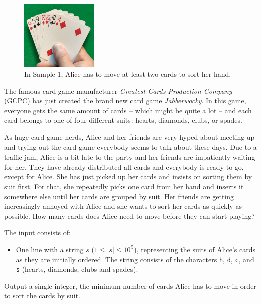 
\newcommand{\name}{Jabberwocky}

\begin{figure}
  \vspace{-5mm}
	\includegraphics[width=0.33\textwidth]{sample}
	\caption{In Sample 1, Alice has to move at least two cards to sort her hand.}
	  \vspace{-5mm}
\end{figure}
The famous card game manufacturer \emph{Greatest Cards Production Company} (GCPC) has just created the brand new card game \emph{\name}.
In this game, everyone gets the same amount of cards -- which might be quite a lot -- and each card belongs to one of four different suits: hearts, diamonds, clubs, or spades.

As huge card game nerds, Alice and her friends are very hyped about meeting up and trying out the card game \mbox{everybody} seems to talk about these days.
Due to a \mbox{traffic} jam, Alice is a bit late to the party and her friends are \mbox{impatiently} waiting for her.
They have already distributed all cards and everybody is ready to go, except for Alice.
She has just picked up her cards and insists on sorting them by suit first.
For that, she repeatedly picks one card from her hand and inserts it somewhere else until her cards are grouped by suit.
Her friends are getting increasingly annoyed with Alice and she wants to sort her cards as quickly as possible.
How many cards does Alice need to move before they can start playing?

\begin{Input}
    The input consists of:
    \begin{itemize}
        \item One line with a string $s$ ($1\leq|s|\leq 10^5$), representing the suits of Alice's cards as they are initially ordered.
        The string consists of the characters \texttt{h}, \texttt{d}, \texttt{c}, and \texttt{s} (hearts, diamonds, clubs and spades).
    \end{itemize}
\end{Input}

\begin{Output}
    Output a single integer, the minimum number of cards Alice has to move in order to sort the cards by suit.
\end{Output}
